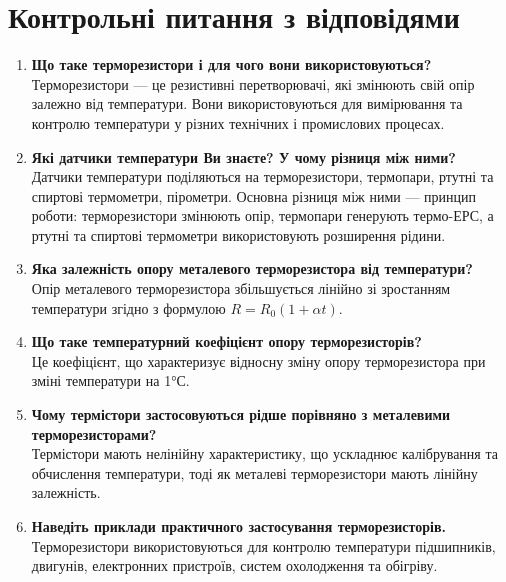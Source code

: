 \documentclass[a4paper]{article}
\begin{document}
\section*{Контрольні питання з відповідями}
\begin{enumerate}
    \item \textbf{Що таке терморезистори і для чого вони використовуються?}\\
    Терморезистори — це резистивні перетворювачі, які змінюють свій опір залежно від температури. Вони використовуються для вимірювання та контролю температури у різних технічних і промислових процесах.
    
    \item \textbf{Які датчики температури Ви знаєте? У чому різниця між ними?}\\
    Датчики температури поділяються на терморезистори, термопари, ртутні та спиртові термометри, пірометри. Основна різниця між ними — принцип роботи: терморезистори змінюють опір, термопари генерують термо-ЕРС, а ртутні та спиртові термометри використовують розширення рідини.
    
    \item \textbf{Яка залежність опору металевого терморезистора від температури?}\\
    Опір металевого терморезистора збільшується лінійно зі зростанням температури згідно з формулою $R = R_0 (1 + \alpha t)$.
    
    \item \textbf{Що таке температурний коефіцієнт опору терморезисторів?}\\
    Це коефіцієнт, що характеризує відносну зміну опору терморезистора при зміні температури на 1°С.
    
    \item \textbf{Чому термістори застосовуються рідше порівняно з металевими терморезисторами?}\\
    Термістори мають нелінійну характеристику, що ускладнює калібрування та обчислення температури, тоді як металеві терморезистори мають лінійну залежність.
    
    \item \textbf{Наведіть приклади практичного застосування терморезисторів.}\\
    Терморезистори використовуються для контролю температури підшипників, двигунів, електронних пристроїв, систем охолодження та обігріву.
\end{enumerate}
\end{document}
